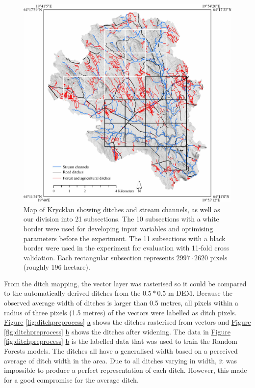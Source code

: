 \documentclass[]{interact}
\theoremstyle{plain}%
\theoremstyle{definition}
\theoremstyle{remark}
\begin{document}
\begin{figure}
    \centering
    \includegraphics[width=1\linewidth]{./images/Krycklan_lo.jpg}
    \caption{Map of Krycklan showing ditches and stream channels, as well as our division into 21 subsections. The 10 subsections with a white border were used for developing input variables and optimising parameters before the experiment. The 11 subsections with a black border were used in the experiment for evaluation with 11-fold cross validation. Each rectangular subsection represents $2997 \cdot 2620$ pixels (roughly 196 hectare).}
    \label{fig:swedenkrycklan}
\end{figure}

From the ditch mapping, the vector layer was rasterised so it could be compared to the automatically derived ditches from the $0.5*0.5$ m DEM. Because the observed average width of ditches is larger than 0.5 metres, all pixels within a radius of three pixels (1.5 metres) of the vectors were labelled as ditch pixels. \hyperref[fig:ditchpreprocess]{Figure} \ref{fig:ditchpreprocess} \hyperref[fig:ditchpreprocess]{a} shows the ditches rasterised from vectors and \hyperref[fig:ditchpreprocess]{Figure} \ref{fig:ditchpreprocess} \hyperref[fig:ditchpreprocess]{b} shows the ditches after widening. The data in \hyperref[fig:ditchpreprocess]{Figure} \ref{fig:ditchpreprocess} \hyperref[fig:ditchpreprocess]{b} is the labelled data that was used to train the Random Forests models. The ditches all have a generalised width based on a perceived average of ditch width in the area. Due to all ditches varying in width, it was impossible to produce a perfect representation of each ditch. However, this made for a good compromise for the average ditch.
\end{document}
